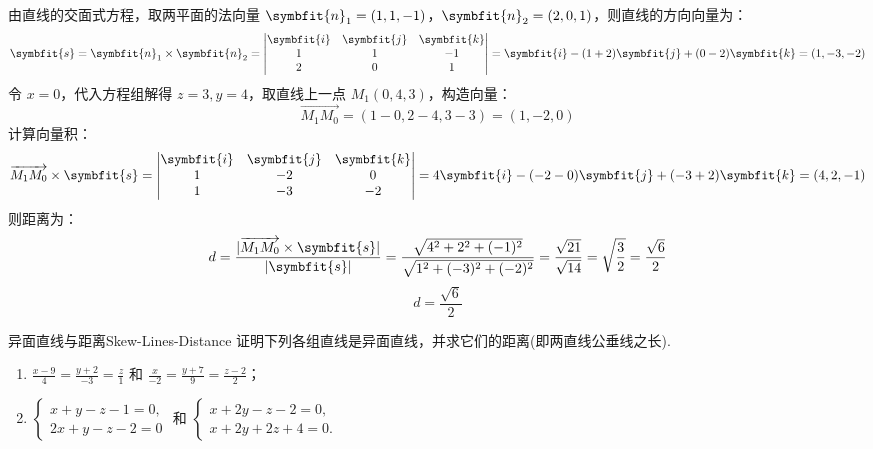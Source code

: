 \begin{solution}
    由直线的交面式方程，取两平面的法向量 $\symbfit{n}_1 = (1, 1, -1)$，$\symbfit{n}_2 = (2, 0, 1)$，则直线的方向向量为：
    \begin{equation}
        \symbfit{s} = \symbfit{n}_1 \times \symbfit{n}_2 = \begin{vmatrix} \symbfit{i} & \symbfit{j} & \symbfit{k} \\ 1 & 1 & -1 \\ 2 & 0 & 1 \end{vmatrix} = \symbfit{i} - (1 + 2)\symbfit{j} + (0 - 2)\symbfit{k} = (1, -3, -2)
    \end{equation}
    令 $x = 0$，代入方程组解得 $z = 3, y = 4$，取直线上一点 $M_1(0, 4, 3)$，构造向量：
    \begin{equation}
        \overrightarrow{M_1M_0} = (1 - 0, 2 - 4, 3 - 3) = (1, -2, 0)
    \end{equation}
    计算向量积：
    \begin{equation}
        \overrightarrow{M_1M_0} \times \symbfit{s} = \begin{vmatrix} \symbfit{i} & \symbfit{j} & \symbfit{k} \\ 1 & -2 & 0 \\ 1 & -3 & -2 \end{vmatrix} = 4\symbfit{i} - (-2 - 0)\symbfit{j} + (-3 + 2)\symbfit{k} = (4, 2, -1)
    \end{equation}
    则距离为：
    \begin{equation}
        d = \frac{|\overrightarrow{M_1M_0} \times \symbfit{s}|}{|\symbfit{s}|} = \frac{\sqrt{4^2 + 2^2 + (-1)^2}}{\sqrt{1^2 + (-3)^2 + (-2)^2}} = \frac{\sqrt{21}}{\sqrt{14}} = \sqrt{\frac{3}{2}} = \frac{\sqrt{6}}{2}
    \end{equation}
    \begin{equation}
        \boxed{d = \frac{\sqrt{6}}{2}}
    \end{equation}
\end{solution}


\begin{problem}{异面直线与距离}{Skew-Lines-Distance}
    证明下列各组直线是异面直线，并求它们的距离(即两直线公垂线之长).
    \begin{enumerate}
        \item $\frac{x - 9}{4} = \frac{y + 2}{-3} = \frac{z}{1}$ 和 $\frac{x}{-2} = \frac{y + 7}{9} = \frac{z - 2}{2}$；
        \item $\begin{cases} x + y - z - 1 = 0, \\ 2x + y - z - 2 = 0 \end{cases}$ 和 $\begin{cases} x + 2y - z - 2 = 0, \\ x + 2y + 2z + 4 = 0. \end{cases}$
    \end{enumerate}
\end{problem}

